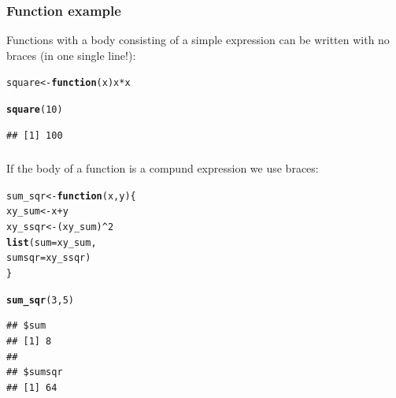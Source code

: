 \documentclass[12pt]{beamer}\usepackage[]{graphicx}\usepackage[]{color}
\makeatletter
\newcommand{\hlnum}[1]{\textcolor[rgb]{0.686,0.059,0.569}{#1}}%
\newcommand{\hlopt}[1]{\textcolor[rgb]{0,0,0}{#1}}%
\newcommand{\hlstd}[1]{\textcolor[rgb]{0.345,0.345,0.345}{#1}}%
\newcommand{\hlkwa}[1]{\textcolor[rgb]{0.161,0.373,0.58}{\textbf{#1}}}%
\newcommand{\hlkwb}[1]{\textcolor[rgb]{0.69,0.353,0.396}{#1}}%
\newcommand{\hlkwc}[1]{\textcolor[rgb]{0.333,0.667,0.333}{#1}}%
\newcommand{\hlkwd}[1]{\textcolor[rgb]{0.737,0.353,0.396}{\textbf{#1}}}%
\newenvironment{kframe}{%
 \def\at@end@of@kframe{}%
 \ifinner\ifhmode%
  \def\at@end@of@kframe{\end{minipage}}%
  \begin{minipage}{\columnwidth}%
 \fi\fi%
 \def\FrameCommand##1{\hskip\@totalleftmargin \hskip-\fboxsep
 \colorbox{shadecolor}{##1}\hskip-\fboxsep
     \hskip-\linewidth \hskip-\@totalleftmargin \hskip\columnwidth}%
 \MakeFramed {\advance\hsize-\width
   \@totalleftmargin\z@ \linewidth\hsize
   \@setminipage}}%
 {\par\unskip\endMakeFramed%
 \at@end@of@kframe}
\newenvironment{knitrout}{}{} %
\makeatother
\begin{document}

\begin{frame}[fragile]
\frametitle{Function example}

Functions with a body consisting of a simple expression can be written with no braces (in one single line!):
\begin{knitrout}\footnotesize
{}\color{fgcolor}\begin{kframe}
\begin{alltt}
\hlstd{square} \hlkwb{<-} \hlkwa{function}\hlstd{(}\hlkwc{x}\hlstd{) x} \hlopt{*} \hlstd{x}

\hlkwd{square}\hlstd{(}\hlnum{10}\hlstd{)}
\end{alltt}
\begin{verbatim}
## [1] 100
\end{verbatim}
\end{kframe}
\end{knitrout}

\end{frame}


\begin{frame}[fragile]
\frametitle{}

If the body of a function is a compund expression we use braces:
\begin{knitrout}\footnotesize
{}\color{fgcolor}\begin{kframe}
\begin{alltt}
\hlstd{sum_sqr} \hlkwb{<-} \hlkwa{function}\hlstd{(}\hlkwc{x}\hlstd{,} \hlkwc{y}\hlstd{) \{}
  \hlstd{xy_sum} \hlkwb{<-} \hlstd{x} \hlopt{+} \hlstd{y}
  \hlstd{xy_ssqr} \hlkwb{<-} \hlstd{(xy_sum)}\hlopt{^}\hlnum{2}
  \hlkwd{list}\hlstd{(}\hlkwc{sum} \hlstd{= xy_sum,}
       \hlkwc{sumsqr} \hlstd{= xy_ssqr)}
\hlstd{\}}

\hlkwd{sum_sqr}\hlstd{(}\hlnum{3}\hlstd{,} \hlnum{5}\hlstd{)}
\end{alltt}
\begin{verbatim}
## $sum
## [1] 8
## 
## $sumsqr
## [1] 64
\end{verbatim}
\end{kframe}
\end{knitrout}

\end{frame}

\end{document}
